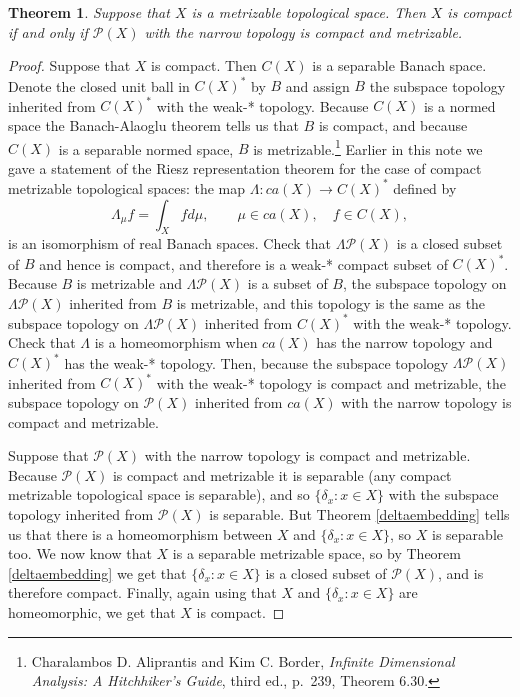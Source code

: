 \documentclass{article}
\newtheorem{theorem}{Theorem}
\theoremstyle{definition}
\begin{document}
\begin{theorem}
Suppose that $X$ is a metrizable topological space. Then $X$ is compact if and only if $\mathscr{P}(X)$ with the narrow topology is compact
and metrizable.
\label{Pcompact}
\end{theorem}
\begin{proof}
Suppose that $X$ is compact. Then $C(X)$ is a separable Banach space. Denote the closed unit ball
in $C(X)^*$ by $B$ and assign $B$ the subspace topology inherited from $C(X)^*$ with the weak-*
topology. Because $C(X)$ is a normed space
the Banach-Alaoglu theorem tells us that $B$
is  compact, and because $C(X)$ is a separable normed space,  
$B$ is metrizable.\footnote{Charalambos D. 
Aliprantis and Kim C. Border, {\em Infinite Dimensional Analysis: A Hitchhiker's Guide}, third ed., p.~239, Theorem 6.30.}
Earlier in this note we gave a statement of the Riesz representation theorem for the case of
compact metrizable topological spaces:  the map $\Lambda:ca(X) \to C(X)^*$ defined by
\[
\Lambda_\mu f = \int_X f d\mu, \qquad \mu \in ca(X), \quad f \in C(X),
\]
is an isomorphism of real Banach spaces. Check that $\Lambda \mathscr{P}(X)$ is a closed subset of $B$ and hence
is  compact, and therefore is a weak-* compact subset of $C(X)^*$. 
 Because  $B$  is metrizable and $\Lambda \mathscr{P}(X)$ is a subset of $B$, the subspace
topology on $\Lambda \mathscr{P}(X)$ inherited from $B$ is metrizable, and this topology is the same as the subspace
topology on $\Lambda \mathscr{P}(X)$ inherited from $C(X)^*$ with the weak-* topology. 
Check that $\Lambda$ is a homeomorphism  when $ca(X)$
has the narrow topology and $C(X)^*$ has the weak-* topology. 
Then, because the subspace topology $\Lambda \mathscr{P}(X)$ inherited from $C(X)^*$ with the weak-* topology
is compact and metrizable, the subspace topology on $\mathscr{P}(X)$ inherited from $ca(X)$ with the narrow topology
is compact and metrizable.

Suppose that $\mathscr{P}(X)$ with the narrow topology is compact and metrizable. 
Because $\mathscr{P}(X)$ is compact and metrizable it is separable (any compact metrizable topological space is separable), and so $\{\delta_x: x \in X\}$ with the subspace
topology inherited from $\mathscr{P}(X)$ is separable. 
But
Theorem \ref{deltaembedding} tells us that there is a homeomorphism between $X$ and $\{\delta_x: x \in X\}$,  so $X$ is separable too.  We now know that $X$ is a separable metrizable space, so by Theorem \ref{deltaembedding}
we get that $\{\delta_x : x \in X\}$ is a closed subset of $\mathscr{P}(X)$, and is therefore compact. Finally, again using
that $X$ and $\{\delta_x:x \in X\}$ are homeomorphic, we get that $X$ is compact.  
\end{proof}
\end{document}
